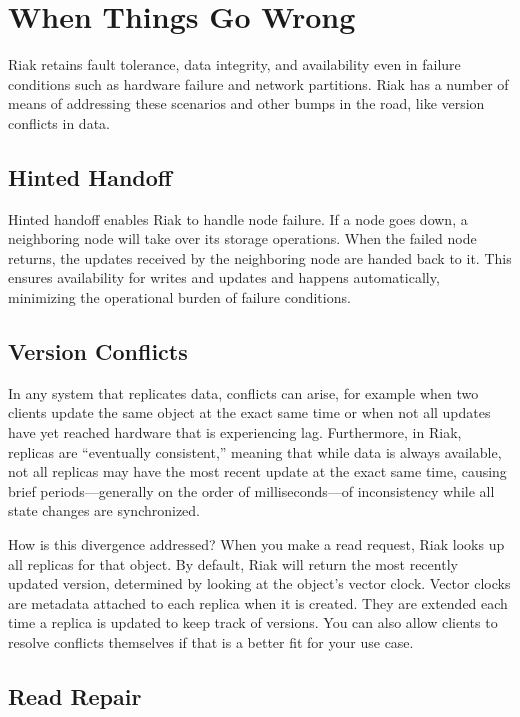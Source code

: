 \documentclass[letter]{book}
\begin{document}
\section{When Things Go Wrong}\label{when-things-go-wrong}

Riak retains fault tolerance, data integrity, and availability even in failure conditions such as hardware failure and network partitions. Riak has a number of means of addressing these scenarios and other bumps in the road, like version conflicts in data.

\subsection{Hinted Handoff}\label{hinted-handoff}

Hinted handoff enables Riak to handle node failure. If a node goes down, a neighboring node will take over its storage operations. When the failed node returns, the updates received by the neighboring node are handed back to it. This ensures availability for writes and updates and happens automatically, minimizing the operational burden of failure conditions.

\subsection{Version Conflicts}\label{version-conflicts}

In any system that replicates data, conflicts can arise, for example when two clients update the same object at the exact same time or when not all updates have yet reached hardware that is experiencing lag. Furthermore, in Riak, replicas are “eventually consistent,” meaning that while data is always available, not all replicas may have the most recent update at the exact same time, causing brief periods---generally on the order of milliseconds---of inconsistency while all state changes are synchronized.

How is this divergence addressed? When you make a read request, Riak looks up all replicas for that object. By default, Riak will return the most recently updated version, determined by looking at the object's vector clock. Vector clocks are metadata attached to each replica when it is created. They are extended each time a replica is updated to keep track of versions. You can also allow clients to resolve conflicts themselves if that is a better fit for your use case.

\subsection{Read Repair}\label{read-repair}
\end{document}
